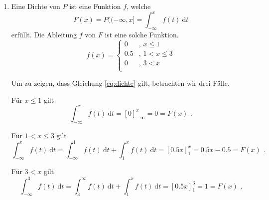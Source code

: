 \documentclass[a4paper]{scrartcl}
\begin{document}
\begin{enumerate}[label=\bfseries\arabic*.]
\begin{enumerate}[label=(\alph*)]
            \item
                Eine Dichte von $P$ ist eine Funktion $f$, welche
                \begin{equation}
                    F(x) = P((-\infty, x] = \int_{-\infty}^x f(t) \ \textrm{d}t
                    \label{eq:dichte}
                \end{equation}
                erfüllt.
                Die Ableitung $f$ von $F$ ist eine solche Funktion.
                \begin{equation*}
                    f(x) =
                    \begin{cases}
                        0 & \text{, } x \leq 1 \\
                        \num{0,5} & \text{, } 1 < x \leq 3 \\
                        0 & \text{, } 3 < x \\
                    \end{cases}
                \end{equation*}
                
                Um zu zeigen, dass Gleichung \eqref{eq:dichte} gilt, betrachten
                wir drei Fälle.

                Für $x \leq 1$ gilt
                \begin{equation*}
                    \int_{-\infty}^x f(t)\ \textrm{d}{t}
                    = [0]_{-\infty}^x = 0 = F(x) \text{ .}
                \end{equation*}

                Für $1 < x \leq 3$ gilt
                \begin{equation*}
                    \int_{-\infty}^x f(t)\ \textrm{d}{t}
                    = \int_{-\infty}^1 f(t)\ \textrm{d}{t}
                    + \int_{1}^x f(t)\ \textrm{d}{t}
                    = [\num{0,5}x]_1^x = \num{0,5}x - \num{0,5} = F(x)
                    \text{ .}
                \end{equation*}
                
                Für $3 < x$ gilt
                \begin{equation*}
                    \int_{-\infty}^3 f(t)\ \textrm{d}{t}
                    = \int_3^\infty f(t)\ \textrm{d}{t}
                    + \int_{1}^x f(t)\ \textrm{d}{t}
                    = [\num{0,5}x]_1^3 = 1 = F(x)
                    \text{ .}
                \end{equation*}


\end{enumerate}
\end{enumerate}
\end{document}
